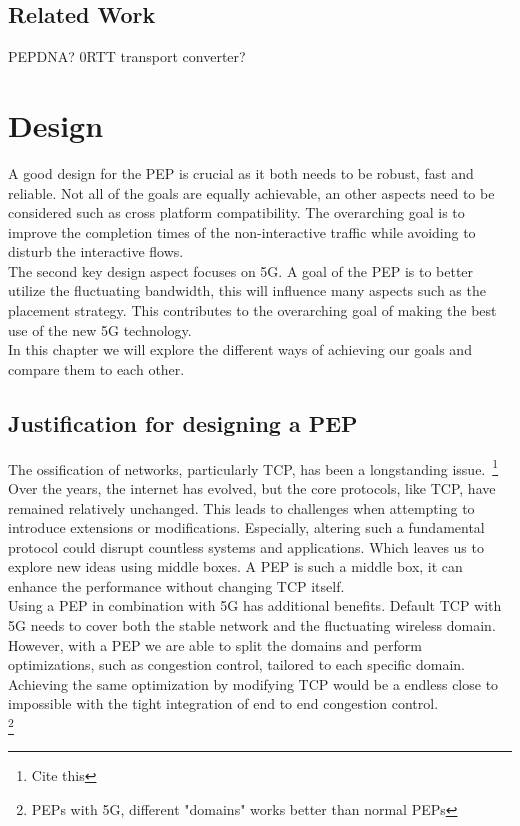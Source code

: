 \documentclass[a4paper,english, 11pt]{report}
\begin{document}
\section{Related Work}
PEPDNA? 0RTT transport converter?


\chapter{Design}
A good design for the PEP is crucial as it both needs to be robust, fast and reliable. Not all of the goals are equally achievable, an other aspects need to be considered such as cross platform compatibility. The overarching goal is to improve the completion times of the non-interactive traffic while avoiding to disturb the interactive flows.\\

The second key design aspect focuses on 5G. A goal of the PEP is to better utilize the fluctuating bandwidth, this will influence many aspects such as the placement strategy. This contributes to the overarching goal of making the best use of the new 5G technology.\\

In this chapter we will explore the different ways of achieving our goals and compare them to each other. 

\section{Justification for designing a PEP}

The ossification of networks, particularly TCP, has been a longstanding issue.~\cite{tcp_extendable}\footnote{Cite this} Over the years, the internet has evolved, but the core protocols, like TCP, have remained relatively unchanged. This leads to challenges when attempting to introduce extensions or modifications. Especially, altering such a fundamental protocol could disrupt countless systems and applications. Which leaves us to explore new ideas using middle boxes. A PEP is such a middle box, it can enhance the performance without changing TCP itself.\\

Using a PEP in combination with 5G has additional benefits. Default TCP with 5G needs to cover both the stable network and the fluctuating wireless domain. However, with a PEP we are able to split the domains and perform optimizations, such as congestion control, tailored to each specific domain. Achieving the same optimization by modifying TCP would be a endless close to impossible with the tight integration of end to end congestion control.\\ \footnote{PEPs with 5G, different "domains" works better than normal PEPs}
\end{document}
